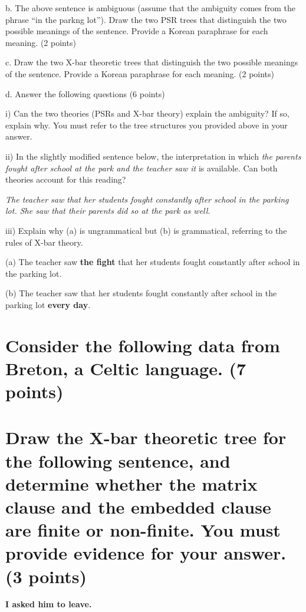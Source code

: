 \documentclass{article}
\begin{document}
\newpage
\noindent b. The above sentence is ambiguous (assume that the ambiguity comes from the phrase ``in the parkng lot''). Draw the two PSR trees that distinguish the two possible meanings of the sentence. Provide a Korean paraphrase for each meaning. (2 points)

\newpage 
\noindent c. Draw the two X-bar theoretic trees that distinguish the two possible meanings of the sentence. Provide a Korean paraphrase for each meaning. (2 points)

\newpage
\noindent d. Answer the following questions (6 points) \par
\medskip \noindent i) Can the two theories (PSRs and X-bar theory) explain the ambiguity? If so, explain why. You must refer to the tree structures you provided above in your answer. \par
\vspace{1.5cm}
\noindent ii) In the slightly modified sentence below, the interpretation in which \textit{the parents fought after school at the park and the teacher saw it} is available. Can both theories account for this reading? \par
\medskip \noindent \textit{The teacher saw that her students fought constantly after school in the parking lot. She saw that their parents did so at the park as well.}\par
\vspace{1.5cm}
\noindent iii) Explain why (a) is ungrammatical but (b) is grammatical, referring to the rules of X-bar theory.\par
\medskip \noindent (a) \*The teacher saw \textbf{the fight} that her students fought constantly after school in the parking lot.\par
\medskip \noindent (b) The teacher saw that her students fought constantly after school in the parking lot \textbf{every day}.

\newpage
\section{Consider the following data from Breton, a Celtic language. \normalsize{(7 points)}}

\newpage
\section{Draw the X-bar theoretic tree for the following sentence, and determine whether the matrix clause and the embedded clause are finite or non-finite. You must provide evidence for your answer. \normalsize{(3 points)}}
\medskip
\begin{center} 
    \textbf{I asked him to leave.}
\end{center}
\end{document}
